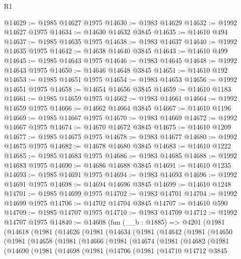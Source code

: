\begin{lexlean}{R1}
\begin{coremodule}
@14629 := @1985 @14627 @1975
@14630 := @1983 @14629
@14632 := @1992 @14627 @1975
@14634 := @14630 @14632 @3845
@14635 := @14610 @494
@14637 := @1985 @14635 @1975
@14638 := @1983 @14637
@14640 := @1992 @14635 @1975
@14642 := @14638 @14640 @3845
@14643 := @14610 @499
@14645 := @1985 @14643 @1975
@14646 := @1983 @14645
@14648 := @1992 @14643 @1975
@14650 := @14646 @14648 @3845
@14651 := @14610 @192
@14653 := @1985 @14651 @1975
@14654 := @1983 @14653
@14656 := @1992 @14651 @1975
@14658 := @14654 @14656 @3845
@14659 := @14610 @1183
@14661 := @1985 @14659 @1975
@14662 := @1983 @14661
@14664 := @1992 @14659 @1975
@14666 := @14662 @14664 @3845
@14667 := @14610 @1196
@14669 := @1985 @14667 @1975
@14670 := @1983 @14669
@14672 := @1992 @14667 @1975
@14674 := @14670 @14672 @3845
@14675 := @14610 @1209
@14677 := @1985 @14675 @1975
@14678 := @1983 @14677
@14680 := @1992 @14675 @1975
@14682 := @14678 @14680 @3845
@14683 := @14610 @1222
@14685 := @1985 @14683 @1975
@14686 := @1983 @14685
@14688 := @1992 @14683 @1975
@14690 := @14686 @14688 @3845
@14691 := @14610 @1235
@14693 := @1985 @14691 @1975
@14694 := @1983 @14693
@14696 := @1992 @14691 @1975
@14698 := @14694 @14696 @3845
@14699 := @14610 @1248
@14701 := @1985 @14699 @1975
@14702 := @1983 @14701
@14704 := @1992 @14699 @1975
@14706 := @14702 @14704 @3845
@14707 := @14610 @590
@14709 := @1985 @14707 @1975
@14710 := @1983 @14709
@14712 := @1992 @14707 @1975
@14840 := @14608
    (fun (__b : @1885) =>
    @4201
      (@1981
        (@14618
          (@1981
            (@14626
              (@1981
                (@14634
                  (@1981
                    (@14642
                      (@1981
                        (@14650
                          (@1981
                            (@14658
                              (@1981
                                (@14666
                                  (@1981
                                    (@14674
                                      (@1981
                                        (@14682
                                          (@1981
                                            (@14690
                                              (@1981
                                                (@14698
                                                  (@1981
                                                    (@14706
                                                      (@1981
                                                        (@14710
                                                          @14712
                                                          @3845

\end{coremodule}
\end{lexlean}
